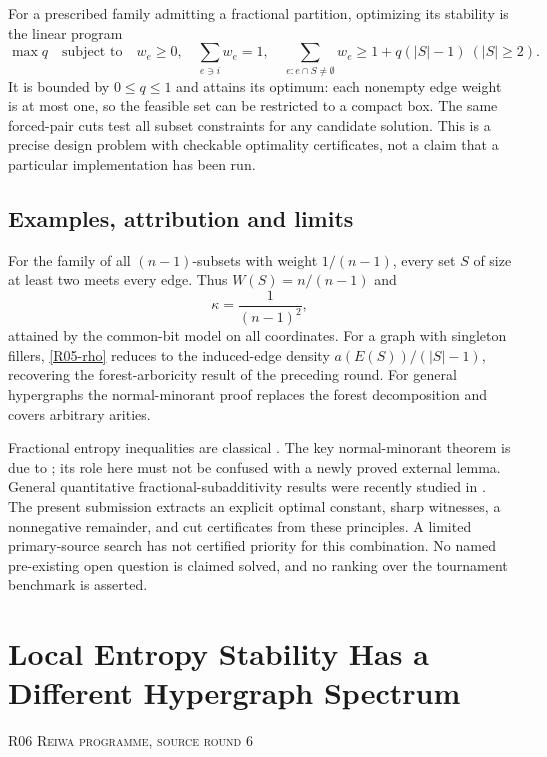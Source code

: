 \documentclass[11pt,a4paper]{article}
\theoremstyle{definition}\newtheorem{definition}[theorem]{Definition}
\theoremstyle{remark}\newtheorem{remark}[theorem]{Remark}
\numberwithin{equation}{section}
\begin{document}
For a prescribed family admitting a fractional partition, optimizing its stability is the linear program
\[
\max q\quad\text{subject to}\quad
w_e\geq0,\quad\sum_{e\ni i}w_e=1,\quad
\sum_{e:e\cap S\ne\emptyset}w_e\geq1+q(|S|-1)\ (|S|\geq2).
\]
It is bounded by $0\leq q\leq1$ and attains its optimum: each nonempty edge weight is at most one, so the feasible set can be restricted to a compact box. The same forced-pair cuts test all subset constraints for any candidate solution. This is a precise design problem with checkable optimality certificates, not a claim that a particular implementation has been run.

\subsection{Examples, attribution and limits}\label{R05-sec-6}
For the family of all $(n-1)$-subsets with weight $1/(n-1)$, every set $S$ of size at least two meets every edge. Thus $W(S)=n/(n-1)$ and
\[
\kappa=\frac1{(n-1)^2},
\]
attained by the common-bit model on all coordinates. For a graph with singleton fillers, \eqref{R05-rho} reduces to the induced-edge density $a(E(S))/(|S|-1)$, recovering the forest-arboricity result of the preceding round. For general hypergraphs the normal-minorant proof replaces the forest decomposition and covers arbitrary arities.

Fractional entropy inequalities are classical \cite{ref068}. The key normal-minorant theorem is due to \cite{ref067}; its role here must not be confused with a newly proved external lemma. General quantitative fractional-subadditivity results were recently studied in \cite{ref066}. The present submission extracts an explicit optimal constant, sharp witnesses, a nonnegative remainder, and cut certificates from these principles. A limited primary-source search has not certified priority for this combination. No named pre-existing open question is claimed solved, and no ranking over the tournament benchmark is asserted.




\clearpage
\section[R06 --- Local Entropy Stability Has a Different Hypergraph Spectrum]{Local Entropy Stability Has a Different Hypergraph Spectrum}\label{contrib-R06}
\noindent\textsc{R06 \quad Reiwa programme, source round 6}\par\medskip
\end{document}

